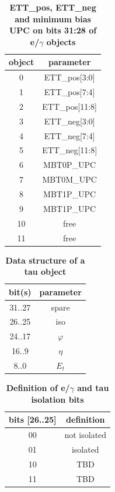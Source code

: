 \documentclass{cmspaper}
\begin{document}
\begin{table}[ht]
\caption{\bf ETT\_pos, ETT\_neg and minimum bias UPC on bits 31:28 of e/$\gamma$ objects}
\vspace{5mm}
\centering
\begin{tabular}{|c|c|}\hline
object & parameter \\\hline\hline
0 & ETT\_pos[3:0] \\
1 & ETT\_pos[7:4] \\
2 & ETT\_pos[11:8] \\
3 & ETT\_neg[3:0] \\
4 & ETT\_neg[7:4] \\
5 & ETT\_neg[11:8] \\
6 & MBT0P\_UPC\\
7 & MBT0M\_UPC\\
8 & MBT1P\_UPC\\
9 & MBT1P\_UPC\\
10 & free\\
11 & free\\\hline
\end{tabular}
\label{table:bits_31_28_eg_object}
\end{table}

\begin{table}[ht]
\caption{\bf Data structure of a tau object}
\vspace{5mm}
\centering
\begin{tabular}{|c|c|}\hline
bit(s) & parameter \\\hline\hline
31..27 & spare \\
26..25 & iso \\
24..17 & $\varphi$ \\
16..9 & $\eta$ \\
8..0 & $E_t$ \\\hline
\end{tabular}
\label{table:tau_object}
\end{table}

\begin{table}[ht]
\caption{\bf Definition of e/$\gamma$ and tau isolation bits}
\vspace{5mm}
\centering
\begin{tabular}{|c|c|}\hline
bits [26..25] & definition \\\hline\hline
00 & not isolated \\
01 & isolated \\
10 & TBD \\
11 & TBD \\\hline
\end{tabular}
\label{table:eg_tau_iso_bits}
\end{table}
\end{document}
